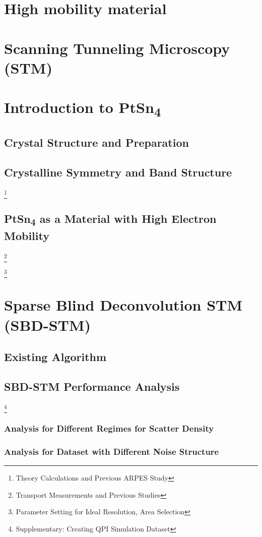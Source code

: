 \chapter{High mobility material}

\chapter{Scanning Tunneling Microscopy (STM)}
	

\chapter{Introduction to PtSn\textsubscript{4}}
	\section{Crystal Structure and Preparation}
	\section{Crystalline Symmetry and Band Structure}
\footnote{Theory Calculations and Previous ARPES Study}
	\section{PtSn\textsubscript{4} as a Material with High Electron Mobility}
	\footnote{Transport Measurements and Previous Studies}




	\footnote{Parameter Setting for Ideal Resolution, Area Selection}

\chapter{Sparse Blind Deconvolution STM (SBD-STM)}
\section{Existing Algorithm}
\section{SBD-STM Performance Analysis}
\footnote{Supplementary: Creating QPI Simulation Dataset}
\subsection{Analysis for Different Regimes for Scatter Density}
\subsection{Analysis for Dataset with Different Noise Structure}
